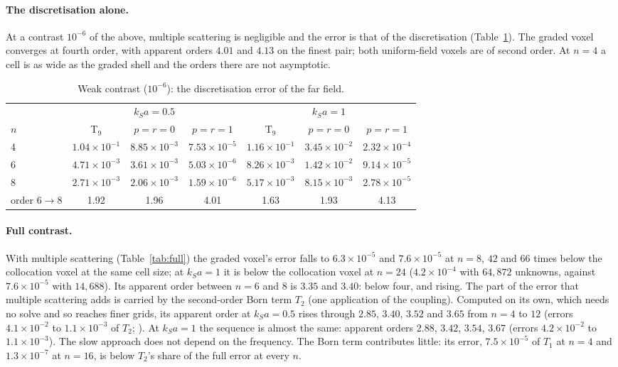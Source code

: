 \documentclass[11pt,a4paper]{article}
\begin{document}
\paragraph{The discretisation alone.} At a contrast $10^{-6}$ of the above, multiple scattering is
negligible and the error is that of the discretisation (Table~\ref{tab:born}). The graded voxel converges
at fourth order, with apparent orders $4.01$ and $4.13$ on the finest pair; both uniform-field voxels are
of second order. At $n=4$ a cell is as wide as the graded shell and the orders there are not
asymptotic.

\begin{table}[ht]
\centering\small
\setlength{\tabcolsep}{5pt}
\begin{tabular}{@{}lcccccc@{}}
\toprule
 & \multicolumn{3}{c}{$k_Sa=0.5$} & \multicolumn{3}{c}{$k_Sa=1$} \\
\cmidrule(lr){2-4}\cmidrule(lr){5-7}
$n$ & T$_9$ & $p=r=0$ & $p=r=1$ & T$_9$ & $p=r=0$ & $p=r=1$ \\
\midrule
4 & $1.04\times10^{-1}$ & $8.85\times10^{-3}$ & $7.53\times10^{-5}$ & $1.16\times10^{-1}$ & $3.45\times10^{-2}$ & $2.32\times10^{-4}$ \\
6 & $4.71\times10^{-3}$ & $3.61\times10^{-3}$ & $5.03\times10^{-6}$ & $8.26\times10^{-3}$ & $1.42\times10^{-2}$ & $9.14\times10^{-5}$ \\
8 & $2.71\times10^{-3}$ & $2.06\times10^{-3}$ & $1.59\times10^{-6}$ & $5.17\times10^{-3}$ & $8.15\times10^{-3}$ & $2.78\times10^{-5}$ \\
order $6\to8$ & 1.92 & 1.96 & 4.01 & 1.63 & 1.93 & 4.13 \\
\bottomrule
\end{tabular}
\caption{Weak contrast ($10^{-6}$): the discretisation error of the far field.}\label{tab:born}
\end{table}

\paragraph{Full contrast.} With multiple scattering (Table~\ref{tab:full}) the graded voxel's error falls
to $6.3\times10^{-5}$ and $7.6\times10^{-5}$ at $n=8$, $42$ and $66$ times below the collocation voxel at
the same cell size; at $k_Sa=1$ it is below the collocation voxel at $n=24$ ($4.2\times10^{-4}$ with
$64{,}872$ unknowns, against $7.6\times10^{-5}$ with $14{,}688$). Its apparent order between $n=6$ and $8$
is $3.35$ and $3.40$: below four, and rising. The part of the error that multiple scattering adds is
carried by the second-order Born term $T_2$ (one application of the coupling). Computed on its own, which
needs no solve and so reaches finer grids, its apparent order at $k_Sa=0.5$ rises through $2.85$, $3.40$,
$3.52$ and $3.65$ from $n=4$ to $12$ (errors $4.1\times10^{-2}$ to $1.1\times10^{-3}$ of $T_2$;
). At $k_Sa=1$ the sequence is almost the same: apparent orders
$2.88$, $3.42$, $3.54$, $3.67$ (errors $4.2\times10^{-2}$ to $1.1\times10^{-3}$). The slow approach
does not depend on the frequency. The Born term contributes little: its error, $7.5\times10^{-5}$ of
$T_1$ at $n=4$ and $1.3\times10^{-7}$ at $n=16$, is below $T_2$'s share of the full error at every $n$.
\end{document}
